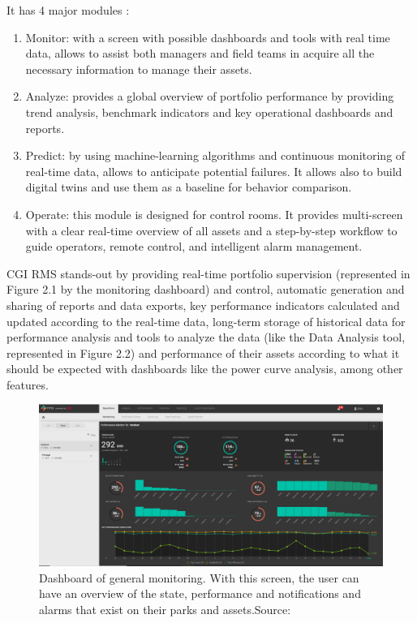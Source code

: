It has 4 major modules \cite{OLD_8}:
\begin{enumerate}
\item
Monitor: with a screen with possible dashboards and tools with real time data, allows to assist both managers and field teams in acquire all the necessary information to manage their assets.

\item
Analyze: provides a global overview of portfolio performance by providing trend analysis, benchmark indicators and key operational dashboards and reports.

\item
Predict: by using machine-learning algorithms and continuous monitoring of real-time data, allows to anticipate potential failures. It allows also to build digital twins and use them as a baseline for behavior comparison.

\item
Operate: this module is designed for control rooms. It provides multi-screen with a clear real-time overview of all assets and a step-by-step workflow to guide operators, remote control, and intelligent alarm management.
\end{enumerate}

CGI RMS stands-out by providing real-time portfolio supervision (represented in Figure 2.1 by the monitoring dashboard) and control, automatic generation and sharing of reports and data exports, key performance indicators calculated and updated according to the real-time data, long-term storage of historical data for performance analysis and tools to analyze the data (like the Data Analysis tool, represented in Figure 2.2) and performance of their assets according to what it should be expected with dashboards like the power curve analysis, among other features.

\begin{figure}[htbp]
	\centering
	\includegraphics[width=\textwidth]{Chapters/Figures/background_fig2.PNG}
	\caption{Dashboard of general monitoring. With this screen, the user can have an overview of the state, performance and notifications and alarms that exist on their parks and assets.Source: \cite{CGIRMS} }
	\label{fig:Figuras_Tree_silhouettes-vectorial}
\end{figure}


